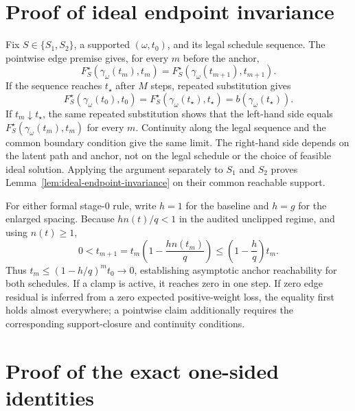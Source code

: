 \documentclass{article}
\begin{document}
\appendix

\section{Proof of ideal endpoint invariance}
\label{app:ideal-proof}

Fix $S\in\{S_1,S_2\}$, a supported $(\omega,t_0)$, and its legal schedule
sequence. The pointwise edge premise gives, for every $m$ before the anchor,
\begin{equation}
  F_S^\star(\gamma_\omega(t_m),t_m)
  =F_S^\star(\gamma_\omega(t_{m+1}),t_{m+1}).
\end{equation}
If the sequence reaches $t_\star$ after $M$ steps, repeated substitution gives
\begin{equation}
  F_S^\star(\gamma_\omega(t_0),t_0)
  =F_S^\star(\gamma_\omega(t_\star),t_\star)
  =b(\gamma_\omega(t_\star)).
\end{equation}
If $t_m\downarrow t_\star$, the same repeated substitution shows that the
left-hand side equals $F_S^\star(\gamma_\omega(t_m),t_m)$ for every $m$.
Continuity along the legal sequence and the common boundary condition give the
same limit. The right-hand side depends on the latent path and anchor, not on
the legal schedule or the choice of feasible ideal solution. Applying the
argument separately to $S_1$ and $S_2$ proves
Lemma~\ref{lem:ideal-endpoint-invariance} on their common reachable support.

For either formal stage-0 rule, write $h=1$ for the baseline and $h=g$ for the
enlarged spacing. Because $h n(t)/q<1$ in the audited unclipped regime, and
using $n(t)\geq1$,
\begin{equation}
  0<t_{m+1}
  =t_m\left(1-\frac{h n(t_m)}{q}\right)
  \leq\left(1-\frac{h}{q}\right)t_m.
\end{equation}
Thus $t_m\leq(1-h/q)^m t_0\rightarrow0$, establishing asymptotic anchor
reachability for both schedules. If a clamp is active, it reaches zero in one
step. If zero edge residual is inferred from a zero expected
positive-weight loss, the equality first holds almost everywhere; a pointwise
claim additionally requires the corresponding support-closure and continuity
conditions.

\section{Proof of the exact one-sided identities}
\label{app:sg-proof}
\end{document}
